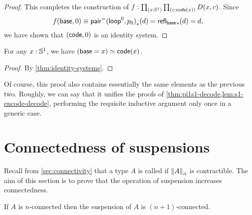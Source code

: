 \begin{proof}
  This completes the construction of $f:\prd{x:\Sn^1}{c:\code(x)} D(x,c)$.
  Since
  \[f(\base,0) \jdeq \trans{\pairpath(\lloop^0,p_0)}{d} = \trans{\refl{\base}}{d} = d,\]
  we have shown that $(\code,0)$ is an identity system.
\end{proof}

\begin{cor}
  For any $x:\Sn^1$, we have $\eqv{(\base=x)}{\code(x)}$.
\end{cor}
\begin{proof}
  By \autoref{thm:identity-systems}.
\end{proof}

Of course, this proof also contains essentially the same elements as the previous two.
Roughly, we can say that it unifies the proofs of \autoref{thm:pi1s1-decode,lem:s1-encode-decode}, performing the requisite inductive argument only once in a generic case.


\section{Connectedness of suspensions}
\label{sec:conn-susp}

Recall from \autoref{sec:connectivity} that a type $A$ is called  if $\trunc nA$ is contractible.
The aim of this section is to prove that the operation of suspension increases connectedness.

\begin{thm} \label{thm:suspension-increases-connectedness}
  If $A$ is $n$-connected then the suspension of $A$ is $(n+1)$-connected.
\end{thm}


